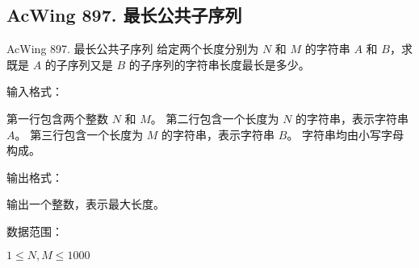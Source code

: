\subsection{AcWing 897. 最长公共子序列}
\begin{titledbox}{AcWing 897. 最长公共子序列}
    给定两个长度分别为 $N$ 和 $M$ 的字符串 $A$ 和 $B$，求既是 $A$ 的子序列又是 $B$ 的子序列的字符串长度最长是多少。

    输入格式：

    第一行包含两个整数 $N$ 和 $M$。 第二行包含一个长度为 $N$ 的字符串，表示字符串 $A$。 第三行包含一个长度为 $M$ 的字符串，表示字符串 $B$。 字符串均由小写字母构成。

    输出格式：

    输出一个整数，表示最大长度。

    数据范围：

    $1 \le N,M \le 1000$

    \begin{inputblock}
         \\
         \\
    \end{inputblock}
    \begin{outputblock}
    \end{outputblock}
\end{titledbox}

